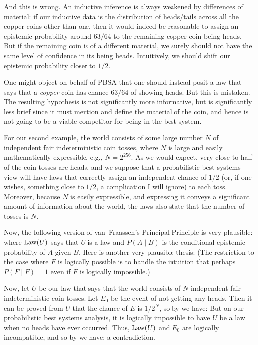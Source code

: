 And this is wrong. An inductive inference is always weakened by differences of material: if our inductive data is the distribution
of heads/tails across all the copper coins other than one, then it would indeed be reasonable to assign an epistemic probability
around $63/64$ to the remaining copper coin being heads. But if the remaining coin is of a different material, we surely should 
not have the same level of confidence in its being heads. Intuitively, we should shift our epistemic probability closer to $1/2$.

One might object on behalf of PBSA that one should instead posit a law that says that a \textit{copper} coin has chance 
$63/64$ of showing heads. But this is mistaken. The resulting hypothesis is not significantly more informative, but is significantly
less brief since it must mention and define the material of the coin, and hence is not going to be a viable competitor for being 
in the best system.

For our second example, the world consists of some large number $N$ of independent fair indeterministic coin tosses, where $N$ is large
and easily mathematically expressible, e.g., $N=2^{256}$. As we would expect, very close to half of the coin tosses are heads, and 
we suppose that a probabilistic best systems view will have laws that correctly assign an independent chance of $1/2$ (or, if 
one wishes,  something close to $1/2$, a complication I will ignore) to each toss. Moreover, because $N$ is easily expressible,
and expressing it conveys a significant amount of information about the world, the laws also state that the number of tosses is
$N$. 

Now, the following version of van~Fraassen's Principal Principle is very plausible:
where $\operatorname{Law}(U)$ says that $U$ is a law and $P(A\mid B)$ is the conditional epistemic probability of $A$ given $B$.
Here is another very plausible thesis:
(The restriction to the case where $F$ is logically possible is to handle the intuition that perhaps $P(F \mid F)=1$
even if $F$ is logically impossible.)

Now, let $U$ be our law that says that the world consists of $N$ independent fair indeterministic coin tosses. Let $E_0$ be the event
of not getting any heads. Then it can be proved from $U$ that the chance of $E$ is $1/2^N$, so by  we have:
But on our probabilistic best systems analysis, it is logically impossible to have $U$ be a law when no heads have ever occurred.
Thus, $\operatorname{Law}(U)$ and $E_0$ are logically incompatible, and so by  we have:
a contradiction.

